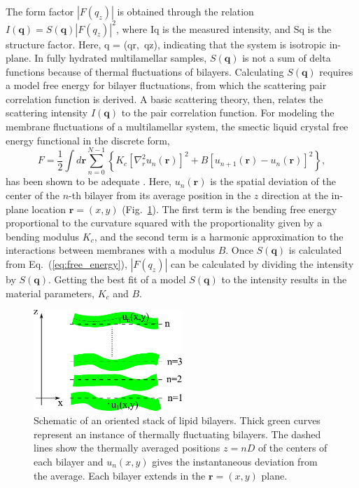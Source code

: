 The form factor $|F(q_z)|$ is obtained through the relation
$I(\mathbf{q})= S(\mathbf{q})|F(q_z)|^2$, where \gls{Iq} is the measured intensity,
and \gls{Sq} is the structure factor.
Here, \gls{q} = (\gls{qr},~\gls{qz}), indicating that the system is isotropic in-plane. 
In fully hydrated multilamellar samples, $S(\mathbf{q})$ is not a sum of delta 
functions because of thermal fluctuations of bilayers. Calculating $S(\mathbf{q})$
requires a model free energy for bilayer fluctuations, from which the scattering
pair correlation function is derived. A basic scattering theory, then, relates
the scattering intensity $I(\mathbf{q})$ to the pair correlation function. 
For modeling the membrane fluctuations of a multilamellar system, 
the smectic liquid crystal free energy functional in the discrete form,
\begin{equation}
  F=\frac{1}{2}\int d\mathbf{r}\sum _{n=0}^{N-1}\left\{ 
  K_{c} \left[\nabla _{r}^{2}u_{n}\left(\mathbf{r}\right)\right]^{2}
  +B\left[u_{n+1}\left(\mathbf{r}\right)-u_{n}\left(\mathbf{r}\right)\right]^{2}
  \right\},
  \label{eq:free_energy}
\end{equation}
has been shown to be adequate \cite{Lyatskaya01}.
Here, $u_{n}\left(\mathbf{r}\right)$ is the spatial deviation of the center 
of the $n$-th bilayer from its average position in the $z$ direction
at the in-plane location $\mathbf{r}=(x,y)$ (Fig.~\ref{fig:stack}).
The first term is the bending free energy proportional to the curvature
squared with the proportionality given by a bending modulus $K_{c}$, and
the second term is a harmonic approximation to the interactions between
membranes with a modulus $B$. 
Once $S(\mathbf{q})$ is calculated 
from Eq.~(\ref{eq:free_energy}), $|F(q_z)|$ can 
be calculated by dividing the intensity by $S(\mathbf{q})$. 
Getting the best fit of a model $S(\mathbf{q})$ to the intensity results in 
the material parameters, $K_c$ and $B$.

\begin{figure}[htbp]
  \centering
  \includegraphics[width=0.5\textwidth]{figures/Tat/MMs/stack}
  \caption[Schematic of an oriented stack of lipid bilayers]
  {Schematic of an oriented stack of lipid bilayers. Thick green curves
  represent an instance of thermally fluctuating bilayers. The dashed lines 
  show the thermally averaged positions $z=nD$ of the centers of each bilayer 
  and $u_{n}(x,y)$ gives the instantaneous deviation from the average. 
  Each bilayer extends in the $\mathbf{r}=\left(x,y\right)$ plane.}
  \label{fig:stack}
\end{figure}

